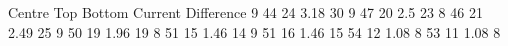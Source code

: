 Centre	Top	Bottom	Current	Difference
9	44	24	3.18	30
9	47	20	2.5 	23
8	46	21	2.49	25
9	50	19	1.96	19
8	51	15	1.46	14
9	51	16	1.46	15
	54	12	1.08	8
	53	11	1.08	8
